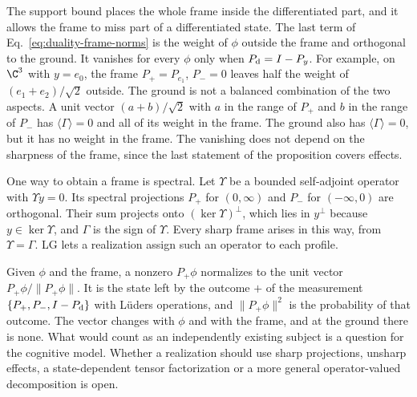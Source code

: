 The support bound places the whole frame inside the differentiated part, and it allows the frame to miss part of a differentiated state. The last term of Eq.~\eqref{eq:duality-frame-norms} is the weight of $\phi$ outside the frame and orthogonal to the ground. It vanishes for every $\phi$ only when $P_{\rm d}=I-P_y$. For example, on $\C^3$ with $y=e_0$, the frame $P_+=P_{e_1}$, $P_-=0$ leaves half the weight of $(e_1+e_2)/\sqrt2$ outside. The ground is not a balanced combination of the two aspects. A unit vector $(a+b)/\sqrt2$ with $a$ in the range of $P_+$ and $b$ in the range of $P_-$ has $\langle\Gamma\rangle=0$ and all of its weight in the frame. The ground also has $\langle\Gamma\rangle=0$, but it has no weight in the frame. The vanishing does not depend on the sharpness of the frame, since the last statement of the proposition covers effects.

One way to obtain a frame is spectral. Let $\Upsilon$ be a bounded self-adjoint operator with $\Upsilon y=0$. Its spectral projections $P_+$ for $(0,\infty)$ and $P_-$ for $(-\infty,0)$ are orthogonal. Their sum projects onto $(\ker\Upsilon)^\perp$, which lies in $y^\perp$ because $y\in\ker\Upsilon$, and $\Gamma$ is the sign of $\Upsilon$. Every sharp frame arises in this way, from $\Upsilon=\Gamma$. LG lets a realization assign such an operator to each profile.

Given $\phi$ and the frame, a nonzero $P_+\phi$ normalizes to the unit vector $P_+\phi/\|P_+\phi\|$. It is the state left by the outcome $+$ of the measurement $\{P_+,P_-,I-P_{\rm d}\}$ with L\"uders operations, and $\|P_+\phi\|^2$ is the probability of that outcome. The vector changes with $\phi$ and with the frame, and at the ground there is none. What would count as an independently existing subject is a question for the cognitive model. Whether a realization should use sharp projections, unsharp effects, a state-dependent tensor factorization or a more general operator-valued decomposition is open.
